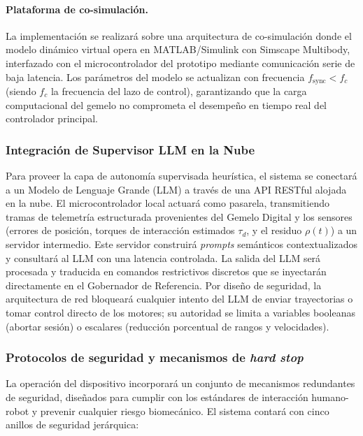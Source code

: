 \documentclass[a4paper,12pt]{article}
\begin{document}
\paragraph{Plataforma de co-simulación.}
La implementación se realizará sobre una arquitectura de co-simulación donde el modelo dinámico virtual opera en MATLAB/Simulink con Simscape Multibody, interfazado con el microcontrolador del prototipo mediante comunicación serie de baja latencia. Los parámetros del modelo se actualizan con frecuencia $f_{\mathrm{sync}} < f_c$ (siendo $f_c$ la frecuencia del lazo de control), garantizando que la carga computacional del gemelo no comprometa el desempeño en tiempo real del controlador principal.

\subsubsection{Integración de Supervisor LLM en la Nube}

Para proveer la capa de autonomía supervisada heurística, el sistema se conectará a un Modelo de Lenguaje Grande (LLM) a través de una API RESTful alojada en la nube. El microcontrolador local actuará como pasarela, transmitiendo tramas de telemetría estructurada provenientes del Gemelo Digital y los sensores (errores de posición, torques de interacción estimados $\tau_d$, y el residuo $\rho(t)$) a un servidor intermedio. Este servidor construirá \textit{prompts} semánticos contextualizados y consultará al LLM con una latencia controlada. La salida del LLM será procesada y traducida en comandos restrictivos discretos que se inyectarán directamente en el Gobernador de Referencia. Por diseño de seguridad, la arquitectura de red bloqueará cualquier intento del LLM de enviar trayectorias o tomar control directo de los motores; su autoridad se limita a variables booleanas (abortar sesión) o escalares (reducción porcentual de rangos y velocidades).

\subsubsection{Protocolos de seguridad y mecanismos de \textit{hard stop}}

La operación del dispositivo incorporará un conjunto de mecanismos redundantes de seguridad, diseñados para cumplir con los estándares de interacción humano-robot y prevenir cualquier riesgo biomecánico. El sistema contará con cinco anillos de seguridad jerárquica:
\end{document}
